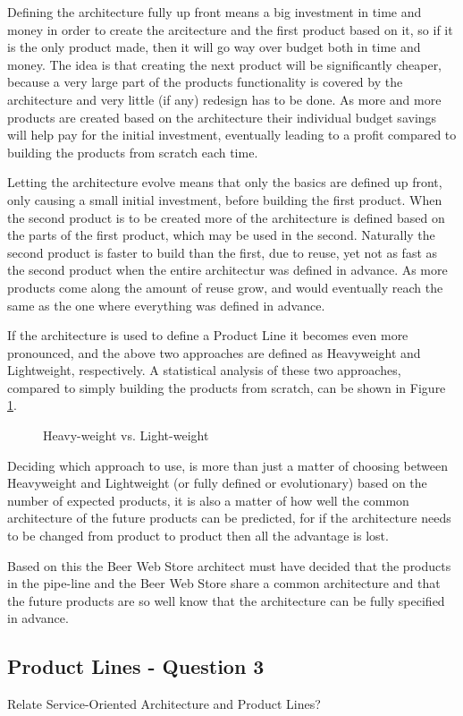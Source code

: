 Defining the architecture fully up front means a big investment in time and money in order to create the arcitecture and the first product based on it, so if it is the only product made, then it will go way over budget both in time and money. The idea is that creating the next product will be significantly cheaper, because a very large part of the products functionality is covered by the architecture and very little (if any) redesign has to be done. As more and more products are created based on the architecture their individual budget savings will help pay for the initial investment, eventually leading to a profit compared to building the products from scratch each time.

Letting the architecture evolve means that only the basics are defined up front, only causing a small initial investment, before building the first product. When the second product is to be created more of the architecture is defined based on the parts of the first product, which may be used in the second. Naturally the second product is faster to build than the first, due to reuse, yet not as fast as the second product when the entire architectur was defined in advance. As more products come along the amount of reuse grow, and would eventually reach the same as the one where everything was defined in advance.

If the architecture is used to define a Product Line it becomes even more pronounced, and the above two approaches are defined as Heavyweight and Lightweight, respectively. A statistical analysis of these two approaches, compared to simply building the products from scratch, can be shown in Figure \ref{fig:product-line}.

\clearpage

\begin{figure}[!htb]
\centerline{}
\caption{Heavy-weight vs. Light-weight}
\label{fig:product-line}
\end{figure}

Deciding which approach to use, is more than just a matter of choosing between Heavyweight and Lightweight (or fully defined or evolutionary) based on the number of expected products, it is also a matter of how well the common architecture of the future products can be predicted, for if the architecture needs to be changed from product to product then all the advantage is lost.

Based on this the Beer Web Store architect must have decided that the products in the pipe-line and the Beer Web Store share a common architecture and that the future products are so well know that the architecture can be fully specified in advance.

\subsection{Product Lines - Question 3}

\begin{question}
Relate Service-Oriented Architecture and Product Lines?
\end{question}


